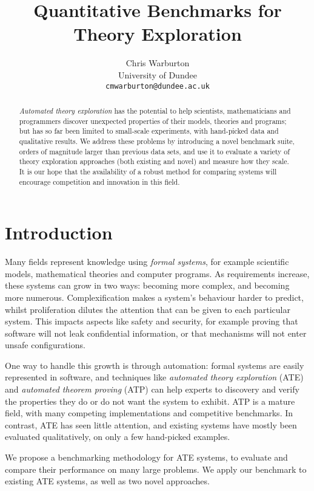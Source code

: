 \documentclass[]{default}
\title{Quantitative Benchmarks for Theory Exploration}
\author{Chris Warburton \\
          University of Dundee \\
          \texttt{cmwarburton@dundee.ac.uk}}
\date{}
\begin{document}
\maketitle
\begin{abstract}
  \emph{Automated theory exploration} has the potential to help scientists,
  mathematicians and programmers discover unexpected properties of their models,
  theories and programs; but has so far been limited to small-scale experiments,
  with hand-picked data and qualitative results. We address these problems by
  introducing a novel benchmark suite, orders of magnitude larger than previous
  data sets, and use it to evaluate a variety of theory exploration approaches
  (both existing and novel) and measure how they scale. It is our hope that the
  availability of a robust method for comparing systems will encourage
  competition and innovation in this field.
\end{abstract}

\section{Introduction}\label{introduction}

Many fields represent knowledge using \emph{formal systems}, for example
scientific models, mathematical theories and computer programs. As requirements
increase, these systems can grow in two ways: becoming more complex, and
becoming more numerous. Complexification makes a system's behaviour harder to
predict, whilst proliferation dilutes the attention that can be given to each
particular system. This impacts aspects like safety and security, for example
proving that software will not leak confidential information, or that mechanisms
will not enter unsafe configurations.

One way to handle this growth is through automation: formal systems are easily
represented in software, and techniques like \emph{automated theory exploration}
(ATE) and \emph{automated theorem proving} (ATP) can help experts to discovery
and verify the properties they do or do not want the system to exhibit. ATP is a
mature field, with many competing implementations and competitive benchmarks. In
contrast, ATE has seen little attention, and existing systems have mostly been
evaluated qualitatively, on only a few hand-picked examples.

We propose a benchmarking methodology for ATE systems, to evaluate and compare
their performance on many large problems. We apply our benchmark to existing ATE
systems, as well as two novel approaches.
\end{document}
